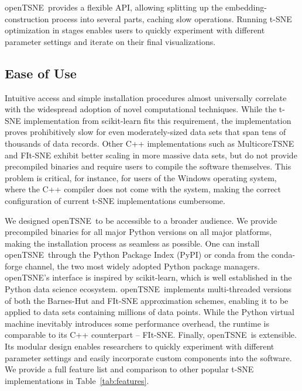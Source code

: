 \documentclass[twocolumn]{bmcart}
\newcommand{\opentsne}{\textsf{openTSNE}}
\begin{document}
\opentsne\ provides a flexible API, allowing splitting up the
embedding-construction process into several parts, caching slow operations.
Running t-SNE optimization in stages enables users to quickly experiment with
different parameter settings and iterate on their final visualizations.

\subsection*{Ease of Use}

Intuitive access and simple installation procedures almost universally correlate
with the widespread adoption of novel computational techniques. While the t-SNE implementation
from \textsf{scikit-learn} fits this requirement, the implementation proves
prohibitively slow for even moderately-sized data sets that span tens of
thousands of data records. Other C++ implementations such as
\textsf{MulticoreTSNE} and \textsf{FIt-SNE} exhibit better scaling in more
massive data sets, but do not provide precompiled binaries and require users to
compile the software themselves. This problem is critical, for instance, for
users of the Windows operating system, where the C++ compiler does not come with the system, making
the correct configuration of current t-SNE implementations cumbersome.

We designed \opentsne\ to be accessible to a broader audience. We
provide precompiled binaries for all major Python versions on all major
platforms, making the installation process as seamless as possible. One can
install \opentsne\ through the Python Package Index (\textsf{PyPI}) or \textsf{conda} from the
\textsf{conda-forge} channel, the two most widely adopted Python package managers.
\opentsne's interface is inspired by \textsf{scikit-learn},
which is well established in the Python data science ecosystem. \opentsne\
implements multi-threaded versions of both the Barnes-Hut and FIt-SNE
approximation schemes, enabling it to be applied to data sets containing millions of data
points. While the Python virtual machine inevitably introduces some performance overhead,
the runtime is comparable to its C++ counterpart -- \textsf{FIt-SNE}. Finally,
\opentsne\ is extensible. Its modular design enables researchers to quickly
experiment with different parameter settings and easily incorporate custom components into
the software. We provide a full feature list and comparison to other popular
t-SNE implementations in Table~\ref{tab:features}.
\end{document}
